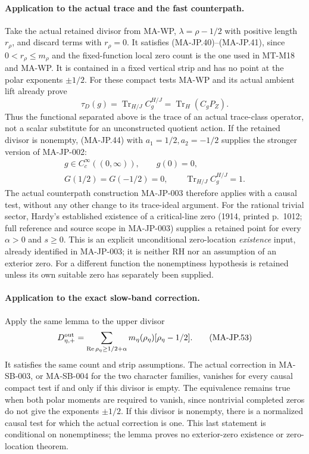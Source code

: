 \paragraph{Application to the actual trace and the fast counterpath.}
Take the actual retained divisor from MA-WP,
$\lambda=\rho-1/2$ with positive length $r_\rho$,
and discard terms with $r_\rho=0$.
It satisfies (MA-JP.40)--(MA-JP.41), since
$0<r_\rho\le m_\rho$ and the fixed-function local
zero count is the one used in MT-M18 and MA-WP.
It is contained in a fixed vertical strip and
has no point at the polar exponents $\pm1/2$.
For these compact tests MA-WP and its actual
ambient lift already prove
\[
 \tau_D(g)=\operatorname{Tr}_{H/J}C_g^{H/J}
                    =\operatorname{Tr}_H(C_gP_Z).
 \tag{MA-JP.51}
\]
Thus the functional separated above is the trace
of an actual trace-class operator, not a scalar
substitute for an unconstructed quotient action.
If the retained divisor is nonempty, (MA-JP.44)
with $a_1=1/2,a_2=-1/2$ supplies the stronger
version of MA-JP-002:
\[
 \begin{gathered}
 g\in C_c^\infty((0,\infty)),\qquad g(0)=0,\\
 G(1/2)=G(-1/2)=0,\qquad
 \operatorname{Tr}_{H/J}C_g^{H/J}=1.
 \end{gathered}
 \tag{MA-JP.52}
\]
The actual counterpath construction MA-JP-003
therefore applies with a causal test, without
any other change to its trace-ideal argument.
For the rational trivial sector, Hardy's established
existence of a critical-line zero (1914, printed
p.~1012; full reference and source scope in MA-JP-003) supplies a
retained point for every $\alpha>0$ and $s\ge0$.
This is an explicit unconditional zero-location
\emph{existence} input, already identified in
MA-JP-003; it is neither RH nor an assumption of
an exterior zero.  For a different function the
nonemptiness hypothesis is retained unless its
own suitable zero has separately been supplied.

\paragraph{Application to the exact slow-band correction.}
Apply the same lemma to the upper divisor
\[
 D_{\eta,+}^{\rm out}
  =\sum_{\operatorname{Re}\rho_\eta\ge1/2+\alpha}
          m_\eta(\rho_\eta)[\rho_\eta-1/2].
 \tag{MA-JP.53}
\]
It satisfies the same count and strip assumptions.
The actual correction in MA-SB-003, or MA-SB-004
for the two character families, vanishes for every
causal compact test if and only if this divisor
is empty.  The equivalence remains true when
both polar moments are required to vanish,
since nontrivial completed zeros do not give
the exponents $\pm1/2$.
If this divisor is nonempty, there is a normalized
causal test for which the actual correction is one.
This last statement is conditional on nonemptiness;
the lemma proves no exterior-zero existence or
zero-location theorem.

